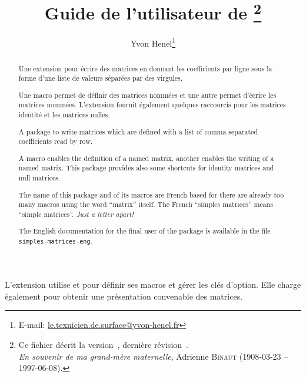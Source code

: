\documentclass[full]{l3doc}
\begin{document}
\title{Guide de l'utilisateur de \thanks{Ce fichier décrit
    la version~\ExplFileVersion, dernière révision~\ExplFileDate.\\
    \emph{En souvenir de ma grand-mère maternelle}, Adrienne \textsc{Binaut}
    (1908-03-23 -- 1997-06-08).}  }
\author{Yvon Henel\thanks{E-mail:
    \href{mailto:le.texnicien.de.surface@yvon-henel.fr}
    {le.texnicien.de.surface@yvon-henel.fr}}}
\maketitle
\noindent\hrulefill

\begin{abstract}
Une extension pour écrire des matrices en donnant les coefficients par ligne
sous la forme d'une liste de valeurs séparées par des virgules.

Une macro permet de définir des matrices nommées et une autre permet d'écrire
les matrices nommées. L'extension fournit également quelques raccourcis pour les
matrices identité et les matrices nulles.
\end{abstract}

\noindent\hrulefill

 \begin{otherlanguage}{english}
\begin{abstract}
A package to write matrices which are defined with a list of comma separated
coefficients read by row.

A macro enables the definition of a named matrix, another enables the writing of
a named matrix. This package provides also some shortcuts for identity matrices
and null matrices.

The name of this package and of its macros are French based for there are
already too many macros using the word ``matrix'' itself. The French
``\foreignlanguage{french}{simples matrices}'' means ``simple
matrices''. \emph{Just a letter apart!}

The English documentation for the final user of the package
 is available in the file \texttt{simples-matrices-eng}.
\end{abstract}
\end{otherlanguage}

\noindent\hrulefill

\tableofcontents{}

\vspace{3\baselineskip}

L'extension  utilise  et  pour
définir ses macros et gérer les clés d'option. Elle charge également
 pour obtenir une présentation convenable des matrices.
\end{document}
